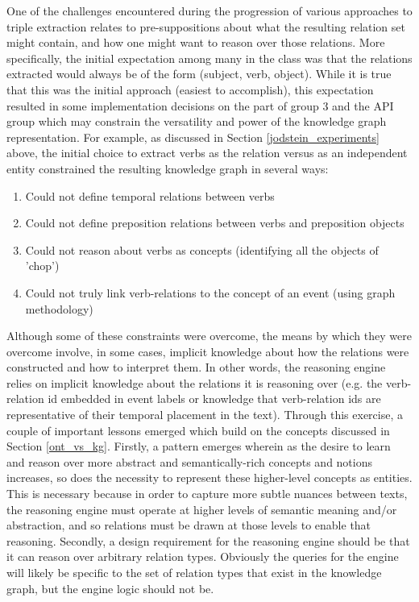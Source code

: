 \documentclass[11pt,letterpaper]{article}
\begin{document}
One of the challenges encountered during the progression of various approaches to triple extraction relates to pre-suppositions about what the resulting relation set might contain, and how one might want to reason over those relations.  More specifically, the initial expectation among many in the class was that the relations extracted would always be of the form (subject, verb, object).  While it is true that this was the initial approach (easiest to accomplish), this expectation resulted in some implementation decisions on the part of group 3 and the API group which may constrain the versatility and power of the knowledge graph representation.  For example, as discussed in Section \ref{jodstein_experiments} above, the initial choice to extract verbs as the relation versus as an independent entity constrained the resulting knowledge graph in several ways:

\begin{enumerate}
    \item Could not define temporal relations between verbs
    \item Could not define preposition relations between verbs and preposition objects
    \item Could not reason about verbs as concepts (identifying all the objects of 'chop')
    \item Could not truly link verb-relations to the concept of an event (using graph methodology)
\end{enumerate}

Although some of these constraints were overcome, the means by which they were overcome involve, in some cases, implicit knowledge about how the relations were constructed and how to interpret them.  In other words, the reasoning engine relies on implicit knowledge about the relations it is reasoning over (e.g. the verb-relation id embedded in event labels or knowledge that verb-relation ids are representative of their temporal placement in the text).  Through this exercise, a couple of important lessons emerged which build on the concepts discussed in Section \ref{ont_vs_kg}.  Firstly, a pattern emerges wherein as the desire to learn and reason over more abstract and semantically-rich concepts and notions increases, so does the necessity to represent these higher-level concepts as entities.  This is necessary because in order to capture more subtle nuances between texts, the reasoning engine must operate at higher levels of semantic meaning and/or abstraction, and so relations must be drawn at those levels to enable that reasoning.  Secondly, a design requirement for the reasoning engine should be that it can reason over arbitrary relation types.  Obviously the queries for the engine will likely be specific to the set of relation types that exist in the knowledge graph, but the engine logic should not be.
\end{document}
